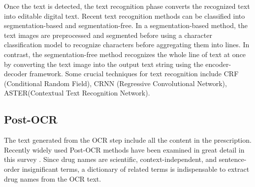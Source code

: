 Once the text is detected, the text recognition phase converts the recognized text into editable digital text. Recent text recognition methods can be classified into segmentation-based and segmentation-free. In a segmentation-based method, the text images are preprocessed and segmented before using a character classification model to recognize characters before aggregating them into lines. In contrast, the segmentation-free method recognizes the whole line of text at once by converting the text image into the output text string using the encoder-decoder framework.
Some crucial techniques for text recognition include CRF (Conditional Random Field), CRNN (Regressive Convolutional Network), ASTER(Contextual Text Recognition Network).

\subsection{Post-OCR}
The text generated from the OCR step include all the content in the prescription. Recently widely used Post-OCR methods have been examined in great detail in this survey \cite{nguyen2021survey}. Since drug names are scientific, context-independent, and sentence-order insignificant terms, a dictionary of related terms is indispensable to extract drug names from the OCR text. 

